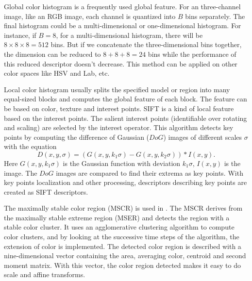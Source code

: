 Global color histogram is a frequently used global feature. For an three-channel image, like an RGB image, each channel is quantized into $B$ bins separately. The final histogram could be a multi-dimensional or one-dimensional histogram. For instance, if $B = 8$, for a multi-dimensional histogram, there will be  $8\times 8\times 8 = 512$ bins. But if we concatenate the three-dimensional bins together, the dimension can be reduced to $8 + 8 + 8 = 24$ bins while the performance of this reduced descriptor doesn't decrease. This method can be applied on other color spaces like HSV and Lab, etc.

Local color histogram usually splits the specified model or region into many equal-sized blocks and computes the global feature of each block. The feature can be based on color, texture and interest points. SIFT \cite{SIFT} is a kind of local feature based on the interest points. The salient interest points (identifiable over rotating and scaling) are selected by the interest operator. This algorithm detects key points by computing the difference of Gaussian ($DoG$) images of different scales $\sigma$ with the equation
\begin{equation}
D(x,y,\sigma) = (G(x,y,k_1\sigma) - G(x,y,k_2\sigma))\ast I(x,y).
\end{equation}
Here $G(x,y,k_1\sigma)$ is the Gaussian function with deviation $k_1\sigma$, $I(x,y)$ is the image. The $DoG$ images are compared to find their extrema as key points. With key points localization and other processing, descriptors describing key points are created as SIFT descriptors.

The maximally stable color region (MSCR) is used in \cite{SDALF}. The MSCR derives from the maximally stable extreme region (MSER) and detects the region with a stable color cluster. It uses an agglomerative clustering algorithm to compute color clusters, and by looking at the successive time steps of the algorithm, the extension of color is implemented. The detected color region is described with a nine-dimensional vector containing the area, averaging color, centroid and second moment matrix. With this vector, the color region detected makes it easy to do scale and affine transforms.

